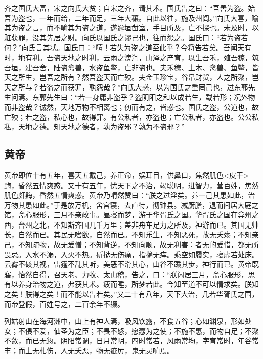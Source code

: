 \documentclass[]{article}
\begin{document}
齐之国氏大富，宋之向氏大贫；自宋之齐，请其术。国氏告之曰：``吾善为盗。始吾为盗也，一年而给，二年而足，三年大穰。自此以往，施及州闾。''向氏大喜，喻其为盗之言，而不喻其为盗之道，遂逾垣凿室，手目所及，亡不探也。未及时，以赃获罪，没其先居之财。向氏以国氏之谬己也，往而怨之。国氏曰：``若为盗若何？''向氏言其状。国氏曰：``嘻！若失为盗之道至此乎？今将告若矣。吾闻天有时，地有利。吾盗天地之时利，云雨之滂润，山泽之产育，以生吾禾，殖吾稼，筑吾垣，建吾舍，陆盗禽兽，水盗鱼鳖，亡非盗也。夫禾稼、土木、禽兽、鱼鳖，皆天之所生，岂吾之所有？然吾盗天而亡殃。夫金玉珍宝，谷帛财货，人之所聚，岂天之所与？若盗之而获罪，孰怨哉？''向氏大惑，以为国氏之重罔己也，过东郭先生问焉。东郭先生曰：``若一身庸非盗乎？盗阴阳之和以成若生，载若形；况外物而非盗哉？诚然，天地万物不相离也；仞而有之，皆惑也。国氏之盗，公道也，故亡殃；若之盗，私心也，故得罪。有公私者，亦盗也；亡公私者，亦盗也。公公私私，天地之德。知天地之德者，孰为盗邪？孰为不盗邪？''

\hypertarget{header-n23}{%
\subsection{黄帝}\label{header-n23}}

黄帝即位十有五年，喜天五戴己，养正命，娱耳目，供鼻口，焦然肌色\textless{}皮干\textgreater{}黣，昏然五情爽惑。又十有五年，忧天下之不治，竭聪明，进智力，营百姓，焦然肌色皯黣，昏然五情爽惑。黄帝乃喟然赞曰：``朕之过淫矣。养一己其患如此，治万物其患如此。''于是放万机，舍宫寝，去直待，彻钟县。减厨膳，退而间居大庭之馆，斋心服形，三月不亲政事。昼寝而梦，游于华胥氏之国。华胥氏之国在弇州之西，台州之北，不知斯齐国几千万里；盖非舟车足力之所及，神游而已。其国无帅长，自然而已。其民无嗜欲，自然而已。不知乐生，不知恶死，故无夭殇；不知亲己，不知疏物，故无爱憎；不知背逆，不知向顺，故无利害：者无的爱惜，都无所畏忌。入水不溺，入火不热。斫挞无伤痛，指擿无痒。乘空如履实，寝虚若处床。云雾不硋其视，雷霆不乱其听，美恶不滑其心，山谷不踬其步，神行而已。黄帝既寤，怡然自得，召天老、力牧、太山稽，告之，曰：``朕闲居三月，斋心服形，思有以养身治物之道，弗获其术。疲而睡，所梦若此。今知至道不可以情求矣。朕知之矣！朕得之矣！而不能以告若矣。''又二十有八年，天下大治，几若华胥氏之国，而帝登假，百姓号之，二百余年不辍。

列姑射山在海河洲中，山上有神人焉，吸风饮露，不食五谷；心如渊泉，形如处女；不偎不爱，仙圣为之臣；不畏不怒，愿悫为之使；不施不惠，而物自足；不聚不敛，而已无愆。阴阳常调，日月常明，四时常若，风雨常均，字育常时，年谷常丰；而土无札伤，人无夭恶，物无疵厉，鬼无灵响焉。
\end{document}
